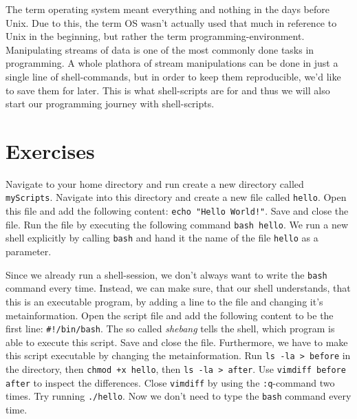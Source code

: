 \documentclass{dcbl/challenge}
\begin{document}
The term operating system meant everything and nothing in the days before Unix.
Due to this, the term OS wasn't actually used that much in reference to Unix in the beginning, but rather the term programming-environment.
Manipulating streams of data is one of the most commonly done tasks in programming.
A whole plathora of stream manipulations can be done in just a single line of shell-commands, but in order to keep them reproducible, we'd like to save them for later.
This is what shell-scripts are for and thus we will also start our programming journey with shell-scripts.


\section*{Exercises}
\begin{aufgabe}
    Navigate to your home directory and run create a new directory called \texttt{myScripts}.
    Navigate into this directory and create a new file called \texttt{hello}.
    Open this file and add the following content: \texttt{echo "Hello World!"}.
    Save and close the file.
    Run the file by executing the following command \texttt{bash hello}.
    We run a new shell explicitly by calling \texttt{bash} and hand it the name of the file \texttt{hello} as a parameter.
\end{aufgabe}

\begin{aufgabe}
    Since we already run a shell-session, we don't always want to write the \texttt{bash} command every time.
    Instead, we can make sure, that our shell understands, that this is an executable program, by adding a line to the file and changing it's metainformation.
    Open the script file and add the following content to be the first line: \texttt{\#!/bin/bash}.
    The so called \textit{shebang} tells the shell, which program is able to execute this script.
    Save and close the file.
    Furthermore, we have to make this script executable by changing the metainformation.
    Run \texttt{ls -la > before} in the directory, then \texttt{chmod +x hello}, then \texttt{ls -la > after}. 
    Use \texttt{vimdiff before after} to inspect the differences.
    Close \texttt{vimdiff} by using the \texttt{:q}-command two times.
    Try running \texttt{./hello}.
    Now we don't need to type the \texttt{bash} command every time.
\end{aufgabe}
\end{document}
